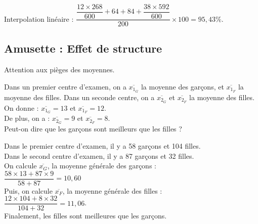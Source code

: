 Interpolation linéaire : $ \dfrac{\dfrac{12 \times 268}{600} + 64 + 84 + \dfrac{38 \times 592}{600}}{200} \times 100 = 95,43$\%. \\

\newpage

\subsection{Amusette : Effet de structure}

Attention aux pièges des moyennes.

Dans un premier centre d'examen, on a $\overline{x_{1_G}}$ la moyenne des garçons, et $\overline{x_{1_F}}$ la moyenne des filles. Dans un seconde centre, on a $\overline{x_{2_G}}$ et $\overline{x_{2_F}}$ la moyenne des filles. \\

On donne : $\overline{x_{1_G}} = 13$ et $\overline{x_{1_F}} = 12$. \\

De plus, on a : $\overline{x_{2_G}} = 9 $ et $\overline{x_{2_F}} = 8$. \\

Peut-on dire que les garçons sont meilleurs que les filles ?

Dans le premier centre d'examen, il y a 58 garçons et 104 filles. \\
Dans le second centre d'examen, il y a 87 garçons et 32 filles. \\

On calcule $\overline{x_G}$, la moyenne générale des garçons : \\

$\dfrac{58 \times 13 + 87 \times 9}{58 + 87} = 10,60 $ \\

Puis, on calcule $\overline{x_F}$, la moyenne générale des filles : \\

$ \dfrac{12 \times 104 + 8 \times 32 }{104 + 32} = 11,06 $. \\

Finalement, les filles sont meilleures que les garçons.

\ifdefined\COMPLETE
\else
    
\fi